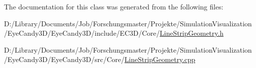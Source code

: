 The documentation for this class was generated from the following files\+:\begin{DoxyCompactItemize}
\item 
D\+:/\+Library/\+Documents/\+Job/\+Forschungsmaster/\+Projekte/\+Simulation\+Visualization/\+Eye\+Candy3\+D/\+Eye\+Candy3\+D/include/\+E\+C3\+D/\+Core/\mbox{\hyperlink{_line_strip_geometry_8h}{Line\+Strip\+Geometry.\+h}}\item 
D\+:/\+Library/\+Documents/\+Job/\+Forschungsmaster/\+Projekte/\+Simulation\+Visualization/\+Eye\+Candy3\+D/\+Eye\+Candy3\+D/src/\+Core/\mbox{\hyperlink{_line_strip_geometry_8cpp}{Line\+Strip\+Geometry.\+cpp}}\end{DoxyCompactItemize}
